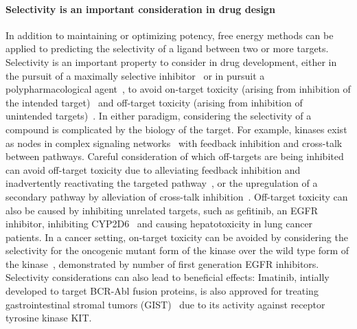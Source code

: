 \documentclass[9pt,lineno]{elife-modified} %
\begin{document}
\paragraph{Selectivity is an important consideration in drug design}
In addition to maintaining or optimizing potency, free energy methods can be applied to predicting the selectivity of a ligand between two or more targets. Selectivity is an important property to consider in drug development, either in the pursuit of a maximally selective inhibitor~\citep{Zhang2009-il,Huggins2012-hr} or in pursuit a polypharmacological agent~\citep{Fan2007-hm,Apsel2008-it,Knight:Nat.Rev.Cancer:2010,Hopkins2006-qu,Hopkins2008-ij}, to avoid on-target toxicity (arising from inhibition of the intended target)~\citep{Rudmann2013-hi}  and off-target toxicity (arising from inhibition of unintended targets)~\citep{Kijima2011-xs,Liu2014-yi}. In either paradigm, considering the selectivity of a compound is complicated by the biology of the target. For example, kinases exist as nodes in complex signaling networks~\citep{Mendoza2011-bj,Tricker2015-xx} with feedback inhibition and cross-talk between pathways. Careful consideration of which off-targets are being inhibited can avoid off-target toxicity due to alleviating feedback inhibition and inadvertently reactivating the targeted pathway~\citep{Mendoza2011-bj,Tricker2015-xx}, or the upregulation of a secondary pathway by alleviation of cross-talk inhibition~\citep{Bailey2014-pd,Chandarlapaty:CancerCell:2011}. Off-target toxicity can also be caused by inhibiting unrelated targets, such as gefitinib, an EGFR inhibitor, inhibiting CYP2D6~\citep{Kijima2011-xs} and causing hepatotoxicity in lung cancer patients. In a cancer setting, on-target toxicity can be avoided by considering the selectivity for the oncogenic mutant form of the kinase over the wild type form of the kinase~\citep{Pao2004-kx,Kim2012-mo,Juchum:DrugResist.Updat.:2015}, demonstrated by number of first generation EGFR inhibitors. Selectivity considerations can also lead to beneficial effects: Imatinib, intially developed to target BCR-Abl fusion proteins, is also approved for treating gastrointestinal stromal tumors (GIST)~\citep{Din2008-ag} due to its activity against receptor tyrosine kinase KIT. 
\end{document}
